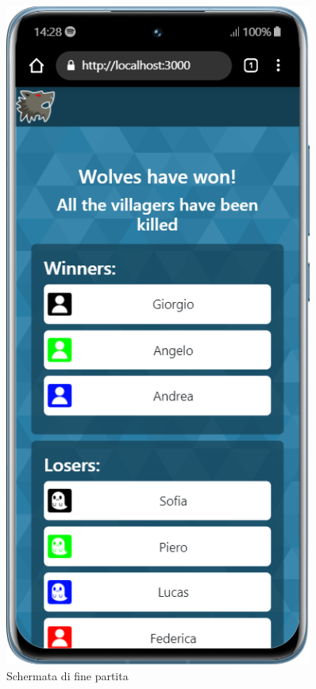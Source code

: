 \begin{figure}[H]
\begin{minipage}{0.45\textwidth}
    \end{minipage}\hfill
    \begin{minipage}{0.45\textwidth}
        \centering
        \includegraphics[width=0.9\textwidth]{img/screen/mobile/won_mobile.png}
        \caption{Schermata di fine partita}
        \label{fig:won_mobile}
    \end{minipage}
\end{figure}

